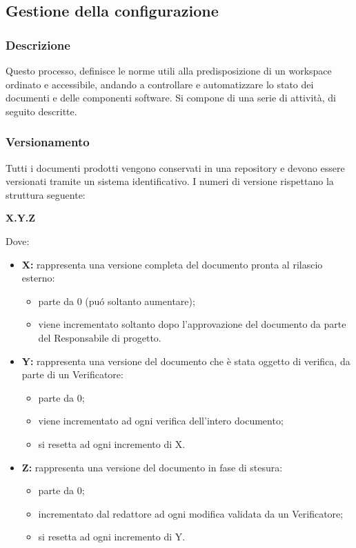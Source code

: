   \subsection{Gestione della configurazione}
    \subsubsection{Descrizione}
      Questo processo, definisce le norme utili alla predisposizione di un workspace ordinato e accessibile, andando a controllare e automatizzare lo stato dei documenti e delle componenti software. Si compone di una serie di attività, di seguito descritte.
    \subsubsection{Versionamento}
        Tutti i documenti prodotti vengono conservati in una repository e devono essere versionati tramite un sistema identificativo. I numeri di versione rispettano la struttura seguente:
        \begin{center}
          \textbf{X.Y.Z}
        \end{center}
        Dove:
        \begin{itemize}
          \item \textbf{X:} rappresenta una versione completa del documento pronta al rilascio esterno:
            \begin{itemize}
              \item parte da 0 (puó soltanto aumentare);
              \item viene incrementato soltanto dopo l'approvazione del documento da parte del Responsabile di progetto.
            \end{itemize}
          \item \textbf{Y:} rappresenta una versione del documento che è stata oggetto di verifica, da parte di un Verificatore:
            \begin{itemize}
              \item parte da 0;
              \item viene incrementato ad ogni verifica dell'intero documento;
              \item si resetta ad ogni incremento di X.
            \end{itemize}
          \item \textbf{Z:} rappresenta una versione del documento in fase di stesura:
            \begin{itemize}
              \item parte da 0;
              \item incrementato dal redattore ad ogni modifica validata da un Verificatore;
              \item si resetta ad ogni incremento di Y.
            \end{itemize}
        \end{itemize}

